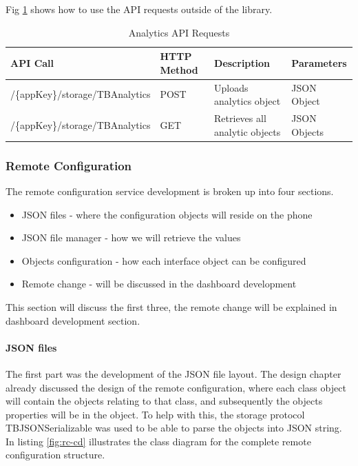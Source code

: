 Fig \ref{table:analytics} shows how to use the API requests outside of the library.

\begin{table}[!h]
\centering
\caption{Analytics API Requests}
\label{table:analytics}
\begin{tabular}{|l|l|l|l|}
\hline
\rowcolor{green!20}
API Call                        & HTTP Method & Description                    & Parameters   \\ \hline
/\{appKey\}/storage/TBAnalytics & POST        & Uploads analytics object       & JSON Object  \\ \hline
/\{appKey\}/storage/TBAnalytics & GET         & Retrieves all analytic objects & JSON Objects \\ \hline
\end{tabular}
\end{table}


\subsubsection{Remote Configuration}

The remote configuration service development is broken up into four sections.

\begin{itemize}
  \item JSON files 
  - where the configuration objects will reside on the phone
  \item JSON file manager
  - how we will retrieve the values
  \item Objects configuration
  - how each interface object can be configured
  \item Remote change
  - will be discussed in the dashboard development
\end{itemize}

This section will discuss the first three, the remote change will be explained in dashboard development section.

\paragraph{JSON files}

The first part was the development of the JSON file layout. The design chapter already discussed the design of the remote configuration, where each class object will contain the objects relating to that class, and subsequently the objects properties will be in the object. To help with this, the storage protocol TBJSONSerializable was used to be able to parse the objects into JSON string. In listing \ref{fig:rc-cd} illustrates the class diagram for the complete remote configuration structure.


